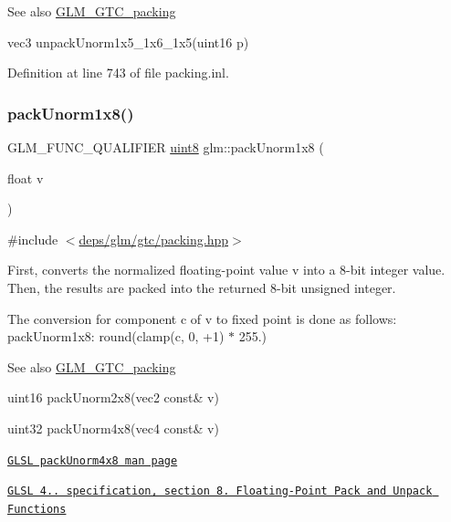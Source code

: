 \begin{DoxySeeAlso}{See also}
\hyperlink{group__gtc__packing}{G\+L\+M\+\_\+\+G\+T\+C\+\_\+packing} 

vec3 unpack\+Unorm1x5\+\_\+1x6\+\_\+1x5(uint16 p) 
\end{DoxySeeAlso}


Definition at line 743 of file packing.\+inl.

\mbox{\label{group__gtc__packing_ga2f9963e5d762b10085b280d3662017ba}} 
\subsubsection{\texorpdfstring{pack\+Unorm1x8()}{packUnorm1x8()}}
{\footnotesize\ttfamily G\+L\+M\+\_\+\+F\+U\+N\+C\+\_\+\+Q\+U\+A\+L\+I\+F\+I\+ER \hyperlink{group__gtc__type__precision_ga1a7dcd8aac97cc8020817c94049deff2}{uint8} glm\+::pack\+Unorm1x8 (\begin{DoxyParamCaption}\item[{float}]{v }\end{DoxyParamCaption})}



{\ttfamily \#include $<$\hyperlink{gtc_2packing_8hpp}{deps/glm/gtc/packing.\+hpp}$>$}

First, converts the normalized floating-\/point value v into a 8-\/bit integer value. Then, the results are packed into the returned 8-\/bit unsigned integer.

The conversion for component c of v to fixed point is done as follows\+: pack\+Unorm1x8\+: round(clamp(c, 0, +1) $\ast$ 255.)

\begin{DoxySeeAlso}{See also}
\hyperlink{group__gtc__packing}{G\+L\+M\+\_\+\+G\+T\+C\+\_\+packing} 

uint16 pack\+Unorm2x8(vec2 const\& v) 

uint32 pack\+Unorm4x8(vec4 const\& v) 

\href{http://www.opengl.org/sdk/docs/manglsl/xhtml/packUnorm4x8.xml}{\tt G\+L\+SL pack\+Unorm4x8 man page} 

\href{http://www.opengl.org/registry/doc/GLSLangSpec.4.20.8.pdf}{\tt G\+L\+SL 4.. specification, section 8. Floating-\/\+Point Pack and Unpack Functions} 
\end{DoxySeeAlso}


